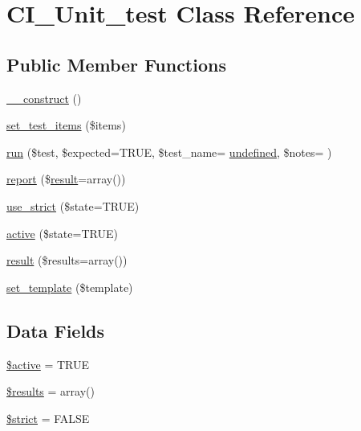 \hypertarget{class_c_i___unit__test}{}\section{C\+I\+\_\+\+Unit\+\_\+test Class Reference}
\label{class_c_i___unit__test}
\subsection*{Public Member Functions}
\begin{DoxyCompactItemize}
\item 
\hyperlink{class_c_i___unit__test_a095c5d389db211932136b53f25f39685}{\+\_\+\+\_\+construct} ()
\item 
\hyperlink{class_c_i___unit__test_a78e364204a36821e23124ae97d447aa3}{set\+\_\+test\+\_\+items} (\$items)
\item 
\hyperlink{class_c_i___unit__test_a4589c9182b5cd90f438b0ff9beea4aab}{run} (\$test, \$expected=T\+R\+U\+E, \$test\+\_\+name= \textquotesingle{}\hyperlink{jquery_8canvasjs_8js_a08113a236cc18d2a9d5ce27e638012be}{undefined}\textquotesingle{}, \$notes= \textquotesingle{}\textquotesingle{})
\item 
\hyperlink{class_c_i___unit__test_a339c46eabb709c1c492bc264c9634171}{report} (\$\hyperlink{class_c_i___unit__test_adcfdd404b2f2610e0690b4beb7786ce5}{result}=array())
\item 
\hyperlink{class_c_i___unit__test_a3b12a79f69fab4221a0b887bdac1ba83}{use\+\_\+strict} (\$state=T\+R\+U\+E)
\item 
\hyperlink{class_c_i___unit__test_ac7b3030630fc7dd31513c75cf27c1a8a}{active} (\$state=T\+R\+U\+E)
\item 
\hyperlink{class_c_i___unit__test_adcfdd404b2f2610e0690b4beb7786ce5}{result} (\$results=array())
\item 
\hyperlink{class_c_i___unit__test_ae65d1ab2a626d4ddfda31befc2b347f6}{set\+\_\+template} (\$template)
\end{DoxyCompactItemize}
\subsection*{Data Fields}
\begin{DoxyCompactItemize}
\item 
\hyperlink{class_c_i___unit__test_aacd1fa47b7ea59451aff98beca4360ae}{\$active} = T\+R\+U\+E
\item 
\hyperlink{class_c_i___unit__test_a233d12bd8b6d3453e9a7a3f0b8c31db2}{\$results} = array()
\item 
\hyperlink{class_c_i___unit__test_a856bf794dded1ba70be4dfae635a1b06}{\$strict} = F\+A\+L\+S\+E
\end{DoxyCompactItemize}
